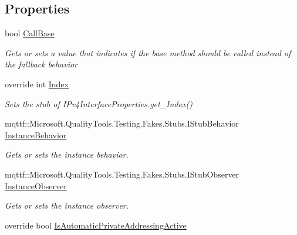 \subsection*{Properties}
\begin{DoxyCompactItemize}
\item 
bool \hyperlink{class_system_1_1_net_1_1_network_information_1_1_fakes_1_1_stub_i_pv4_interface_properties_aced4fa77ee220201d1a8f0d5b89462a3}{Call\-Base}
\begin{DoxyCompactList}\small\item\em Gets or sets a value that indicates if the base method should be called instead of the fallback behavior\end{DoxyCompactList}\item 
override int \hyperlink{class_system_1_1_net_1_1_network_information_1_1_fakes_1_1_stub_i_pv4_interface_properties_a238ed62e7142510fdca75ec1b08df05c}{Index}
\begin{DoxyCompactList}\small\item\em Sets the stub of I\-Pv4\-Interface\-Properties.\-get\-\_\-\-Index()\end{DoxyCompactList}\item 
mqttf\-::\-Microsoft.\-Quality\-Tools.\-Testing.\-Fakes.\-Stubs.\-I\-Stub\-Behavior \hyperlink{class_system_1_1_net_1_1_network_information_1_1_fakes_1_1_stub_i_pv4_interface_properties_afd2da7cef9f2eef90a52179eded82c2b}{Instance\-Behavior}
\begin{DoxyCompactList}\small\item\em Gets or sets the instance behavior.\end{DoxyCompactList}\item 
mqttf\-::\-Microsoft.\-Quality\-Tools.\-Testing.\-Fakes.\-Stubs.\-I\-Stub\-Observer \hyperlink{class_system_1_1_net_1_1_network_information_1_1_fakes_1_1_stub_i_pv4_interface_properties_a204c787c85fb621aa7de1828d152173d}{Instance\-Observer}
\begin{DoxyCompactList}\small\item\em Gets or sets the instance observer.\end{DoxyCompactList}\item 
override bool \hyperlink{class_system_1_1_net_1_1_network_information_1_1_fakes_1_1_stub_i_pv4_interface_properties_ae15b7022ed5695cd81d3b44a7449cb15}{Is\-Automatic\-Private\-Addressing\-Active}

\end{DoxyCompactItemize}
